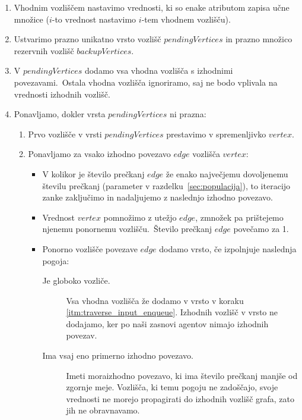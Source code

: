 \documentclass[a4paper,12pt,openright]{book}
\begin{document}
    \begin{enumerate}
        \item Vhodnim vozliščem nastavimo vrednosti, ki so enake atributom zapisa učne množice ($i$-to vrednost nastavimo $i$-tem vhodnem vozlišču).
        \item Ustvarimo prazno unikatno vrsto vozlišč $pendingVertices$ in prazno množico rezervnih vozlišč $backupVertices$.
        \item \label{itm:traverse_input_enqueue} V $pendingVertices$ dodamo vsa vhodna vozlišča s izhodnimi povezavami.\ Ostala vhodna vozlišča
        ignoriramo, saj ne bodo vplivala na vrednosti izhodnih vozlišč.
        \item \label{itm:traverse_pending_loop} Ponavljamo, dokler vrsta $pendingVertices$ ni prazna:
        \begin{enumerate}
            \item Prvo vozlišče v vrsti $pendingVertices$ prestavimo v spremenljivko $vertex$.
            \item Ponavljamo za vsako izhodno povezavo $edge$ vozlišča $vertex$:
            \begin{itemize}
                \item V kolikor je število prečkanj $edge$ že enako največjemu dovoljenemu številu prečkanj (parameter v razdelku~\ref{sec:populacija}),
                to iteracijo zanke zaključimo in nadaljujemo z naslednjo izhodno povezavo.
                \item Vrednost $vertex$ pomnožimo z utežjo $edge$, zmnožek pa pri\-šte\-je\-mo njenemu ponornemu vozlišču.\ Število prečkanj $edge$ povečamo za 1.
                \item Ponorno vozlišče povezave $edge$ dodamo vrsto, če izpolnjuje naslednja pogoja:
                \begin{description}
                    \item[Je globoko vozliče.]{Vsa vhodna vozlišča že dodamo v vrsto v koraku \ref{itm:traverse_input_enqueue}. Izhodnih vozlišč v vrsto
                    ne dodajamo, ker po naši zasnovi agentov nimajo izhodnih povezav.}
                    \item [Ima vsaj eno primerno izhodno povezavo.]{Imeti mora\linebreak izhodno povezavo,
                    ki ima število prečkanj manjše od zgornje meje. Vozlišča, ki temu pogoju ne zadoščajo, svoje vrednosti
                    ne morejo propagirati do izhodnih vozlišč grafa, zato jih ne obravnavamo.}
                \end{description}

\end{itemize}
\end{enumerate}
\end{enumerate}
\end{document}
